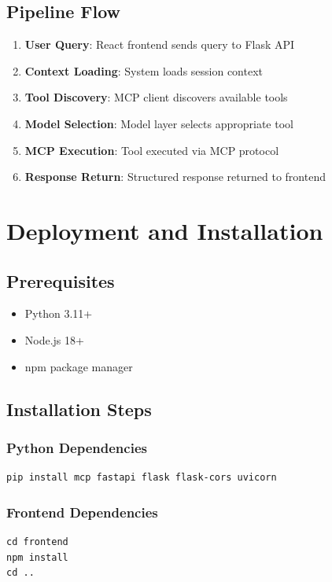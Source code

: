 \documentclass[12pt, a4paper]{report}
\begin{document}
\section{Pipeline Flow}
\begin{enumerate}
    \item \textbf{User Query}: React frontend sends query to Flask API
    \item \textbf{Context Loading}: System loads session context
    \item \textbf{Tool Discovery}: MCP client discovers available tools
    \item \textbf{Model Selection}: Model layer selects appropriate tool
    \item \textbf{MCP Execution}: Tool executed via MCP protocol
    \item \textbf{Response Return}: Structured response returned to frontend
\end{enumerate}

\chapter{Deployment and Installation}

\section{Prerequisites}
\begin{itemize}
    \item Python 3.11+
    \item Node.js 18+
    \item npm package manager
\end{itemize}

\section{Installation Steps}
\subsection{Python Dependencies}
\begin{verbatim}
pip install mcp fastapi flask flask-cors uvicorn
\end{verbatim}

\subsection{Frontend Dependencies}
\begin{verbatim}
cd frontend
npm install
cd ..
\end{verbatim}
\end{document}
